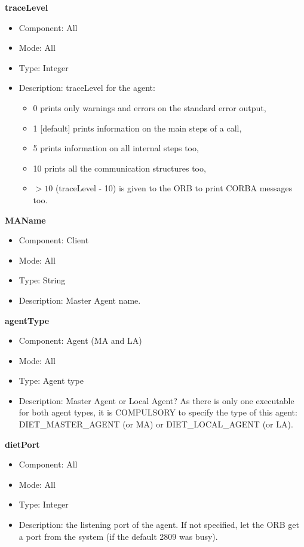 \begin{description}
\item{\bf{traceLevel}}
  \begin{itemize}
  \item Component: All
    \item Mode: All
  \item Type: Integer
  \item Description: traceLevel for the \diet agent:
    \begin{itemize}
    \item  0 \diet prints only warnings and errors on the standard error
      output,
    \item 1 [default] \diet prints information on the main steps
      of a call,
    \item 5 \diet prints information on all internal steps too,
    \item 10 \diet prints all the communication structures too,
    \item $>10$ (traceLevel - 10) is given to the ORB to print CORBA messages
      too.
    \end{itemize}
  \end{itemize}

\item{\bf{MAName}}
  \begin{itemize}
  \item Component: Client
  \item Mode: All
  \item Type: String
  \item Description: Master Agent name.
  \end{itemize}

\item{\bf{agentType}}
  \begin{itemize}
  \item Component: Agent (MA and LA)
  \item Mode: All
  \item Type: Agent type
  \item Description: Master Agent or Local Agent? As there is only one
    executable for both agent types, it is COMPULSORY to specify the type
    of this agent: DIET\_MASTER\_AGENT (or MA) or DIET\_LOCAL\_AGENT (or
    LA).
  \end{itemize}

\item{\bf{dietPort}}
  \begin{itemize}
  \item Component: All
  \item Mode: All
  \item Type: Integer
  \item Description: the listening port of the agent. If not
    specified, let the ORB get a port from the system (if the default
    2809 was busy).
  \end{itemize}


\end{description}

